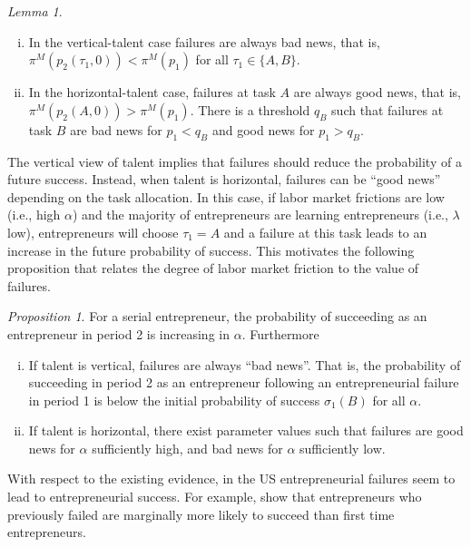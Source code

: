 \documentclass[12pt,american]{paper}
\theoremstyle{remark}
\newtheorem{prop}{Proposition}
\newtheorem{lemma}{Lemma}
\begin{document}
%
\begin{lemma}\label{lem: learning value of failures}
\begin{enumerate}[(i)]\setlength\itemsep{0em}
\item In the vertical-talent case failures are always bad news, that is,  $\pi^M(p_2(\tau_1,0))<\pi^M(p_1)$ for all $\tau_1\in \{A,B\}$.
\item In the horizontal-talent case, failures at task $A$ are always good news, that is, $\pi^M(p_2(A,0))>\pi^M(p_1)$. There is a threshold $q_B$ such that failures at task $B$ are bad news for $p_1<q_B$ and good news for $p_1>q_B$.
\end{enumerate}
\end{lemma}
%
The vertical view of talent implies that failures should reduce the probability of a future success. Instead, when talent is horizontal, failures can be ``good news'' depending on the task allocation. In this case, if labor market frictions are low (i.e., high $\alpha$) and the majority of entrepreneurs are learning entrepreneurs (i.e., $\lambda$ low), entrepreneurs will choose $\tau_1=A$ and a failure at this task leads to an increase in the future probability of success. This motivates the following proposition that relates the degree of labor market friction to the value of failures.
%
\begin{prop}
	\label{prop:probability-of-success} For a serial entrepreneur, the probability of succeeding as an entrepreneur in period 2 is increasing in $\alpha$. Furthermore
 \begin{enumerate}[(i)]\setlength\itemsep{0em}
\item If talent is vertical, failures are always ``bad news''. That is, the probability of succeeding in period 2 as an entrepreneur following an entrepreneurial failure in period 1 is below the initial probability of success $\sigma_1 (B)$ for all $\alpha$. 
\item If talent is horizontal, there exist parameter values such that failures are good news for $\alpha$ sufficiently high, and bad news for $\alpha$ sufficiently low.
\end{enumerate}
\end{prop}
%
With respect to the existing evidence, in the US entrepreneurial failures seem to lead to entrepreneurial success. For example, \citet*{gompers2010performance} show that entrepreneurs who previously failed are marginally more likely to succeed than first time entrepreneurs. %
\end{document}

